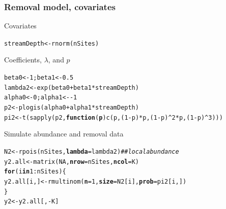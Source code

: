 \documentclass[color=usenames,dvipsnames]{beamer}\usepackage[]{graphicx}\usepackage[]{color}
\makeatletter
\newcommand{\hlnum}[1]{\textcolor[rgb]{0.69,0.494,0}{#1}}%
\newcommand{\hlcom}[1]{\textcolor[rgb]{0.514,0.506,0.514}{\textit{#1}}}%
\newcommand{\hlopt}[1]{\textcolor[rgb]{0,0,0}{#1}}%
\newcommand{\hlstd}[1]{\textcolor[rgb]{0,0,0}{#1}}%
\newcommand{\hlkwa}[1]{\textcolor[rgb]{0,0,0}{\textbf{#1}}}%
\newcommand{\hlkwb}[1]{\textcolor[rgb]{0,0.341,0.682}{#1}}%
\newcommand{\hlkwc}[1]{\textcolor[rgb]{0,0,0}{\textbf{#1}}}%
\newcommand{\hlkwd}[1]{\textcolor[rgb]{0.004,0.004,0.506}{#1}}%
\newenvironment{kframe}{%
 \def\at@end@of@kframe{}%
 \ifinner\ifhmode%
  \def\at@end@of@kframe{\end{minipage}}%
  \begin{minipage}{\columnwidth}%
 \fi\fi%
 \def\FrameCommand##1{\hskip\@totalleftmargin \hskip-\fboxsep
 \colorbox{shadecolor}{##1}\hskip-\fboxsep
     \hskip-\linewidth \hskip-\@totalleftmargin \hskip\columnwidth}%
 \MakeFramed {\advance\hsize-\width
   \@totalleftmargin\z@ \linewidth\hsize
   \@setminipage}}%
 {\par\unskip\endMakeFramed%
 \at@end@of@kframe}
\newenvironment{knitrout}{}{} %
\makeatother
\begin{document}
\begin{frame}[fragile]
  \frametitle{Removal model, covariates}
  \small
  Covariates
  \vspace{-6pt}
\begin{knitrout}\scriptsize
{}\color{fgcolor}\begin{kframe}
\begin{alltt}
\hlstd{streamDepth} \hlkwb{<-} \hlkwd{rnorm}\hlstd{(nSites)}
\end{alltt}
\end{kframe}
\end{knitrout}
\vfill
  Coefficients, $\lambda$, and $p$
  \vspace{-6pt}
\begin{knitrout}\scriptsize
{}\color{fgcolor}\begin{kframe}
\begin{alltt}
\hlstd{beta0} \hlkwb{<-} \hlnum{1}\hlstd{; beta1} \hlkwb{<-} \hlnum{0.5}
\hlstd{lambda2} \hlkwb{<-} \hlkwd{exp}\hlstd{(beta0} \hlopt{+} \hlstd{beta1}\hlopt{*}\hlstd{streamDepth)}
\hlstd{alpha0} \hlkwb{<-} \hlnum{0}\hlstd{; alpha1} \hlkwb{<-} \hlopt{-}\hlnum{1}
\hlstd{p2} \hlkwb{<-} \hlkwd{plogis}\hlstd{(alpha0} \hlopt{+} \hlstd{alpha1}\hlopt{*}\hlstd{streamDepth)}
\hlstd{pi2} \hlkwb{<-} \hlkwd{t}\hlstd{(}\hlkwd{sapply}\hlstd{(p2,} \hlkwa{function}\hlstd{(}\hlkwc{p}\hlstd{)} \hlkwd{c}\hlstd{(p, (}\hlnum{1}\hlopt{-}\hlstd{p)}\hlopt{*}\hlstd{p, (}\hlnum{1}\hlopt{-}\hlstd{p)}\hlopt{^}\hlnum{2}\hlopt{*}\hlstd{p, (}\hlnum{1}\hlopt{-}\hlstd{p)}\hlopt{^}\hlnum{3}\hlstd{)))}
\end{alltt}
\end{kframe}
\end{knitrout}
\vfill
  Simulate abundance and removal data
  \vspace{-6pt}
\begin{knitrout}\scriptsize
{}\color{fgcolor}\begin{kframe}
\begin{alltt}
\hlstd{N2} \hlkwb{<-} \hlkwd{rpois}\hlstd{(nSites,} \hlkwc{lambda}\hlstd{=lambda2)}         \hlcom{## local abundance }
\hlstd{y2.all} \hlkwb{<-} \hlkwd{matrix}\hlstd{(}\hlnum{NA}\hlstd{,} \hlkwc{nrow}\hlstd{=nSites,} \hlkwc{ncol}\hlstd{=K)}
\hlkwa{for}\hlstd{(i} \hlkwa{in} \hlnum{1}\hlopt{:}\hlstd{nSites) \{}
    \hlstd{y2.all[i,]} \hlkwb{<-} \hlkwd{rmultinom}\hlstd{(}\hlkwc{n}\hlstd{=}\hlnum{1}\hlstd{,} \hlkwc{size}\hlstd{=N2[i],} \hlkwc{prob}\hlstd{=pi2[i,])}
\hlstd{\}}
\hlstd{y2} \hlkwb{<-} \hlstd{y2.all[,}\hlopt{-}\hlstd{K]}
\end{alltt}
\end{kframe}
\end{knitrout}
\end{frame}
\end{document}

